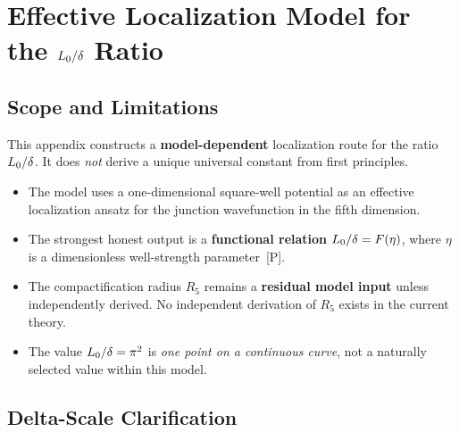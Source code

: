 
\chapter{Effective Localization Model for the $L_0/\delta$ Ratio}
\label{app:L0delta_bvp}

\section{Scope and Limitations}
\label{sec:L0d:scope}

This appendix constructs a \textbf{model-dependent} localization route for the
ratio $L_0/\delta$. It does \emph{not} derive a unique universal constant
from first principles.

\begin{assumptionbox}[title=Scope Framing]
\begin{itemize}
    \item The model uses a one-dimensional square-well potential as an effective
          localization ansatz for the junction wavefunction in the fifth dimension.
    \item The strongest honest output is a \textbf{functional relation}
          $L_0/\delta = F(\eta)$, where $\eta$ is a dimensionless well-strength
          parameter~[P].
    \item The compactification radius $R_5$ remains a \textbf{residual model input}
          unless independently derived. No independent derivation of $R_5$ exists
          in the current theory.
    \item The value $L_0/\delta = \pi^2$ is \emph{one point on a continuous
          curve}, not a naturally selected value within this model.
\end{itemize}
\end{assumptionbox}

\section{Delta-Scale Clarification}
\label{sec:L0d:delta}


